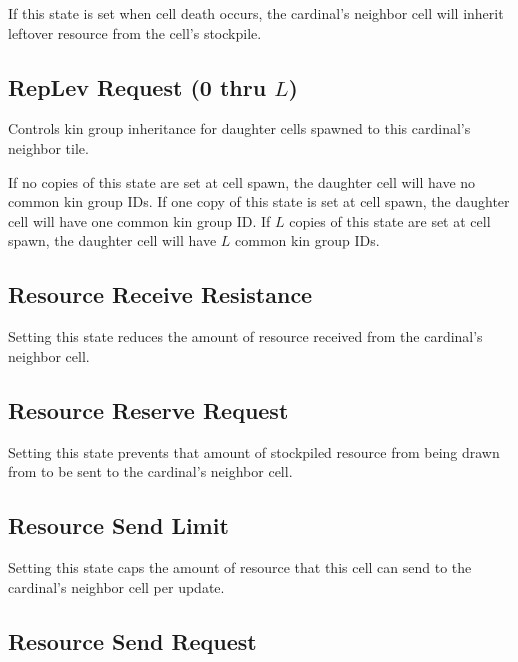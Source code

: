 
If this state is set when cell death occurs, the cardinal's neighbor cell will inherit leftover resource from the cell's stockpile.

\subsection{RepLev Request (0 thru $L$)}


Controls kin group inheritance for daughter cells spawned to this cardinal's neighbor tile.

If no copies of this state are set at cell spawn, the daughter cell will have no common kin group IDs.
If one copy of this state is set at cell spawn, the daughter cell will have one common kin group ID.
If $L$ copies of this state are set at cell spawn, the daughter cell will have $L$ common kin group IDs.

\subsection{Resource Receive Resistance}


Setting this state reduces the amount of resource received from the cardinal's neighbor cell.

\subsection{Resource Reserve Request}


Setting this state prevents that amount of stockpiled resource from being drawn from to be sent to the cardinal's neighbor cell.

\subsection{Resource Send Limit}


Setting this state caps the amount of resource that this cell can send to the cardinal's neighbor cell per update.

\subsection{Resource Send Request}

